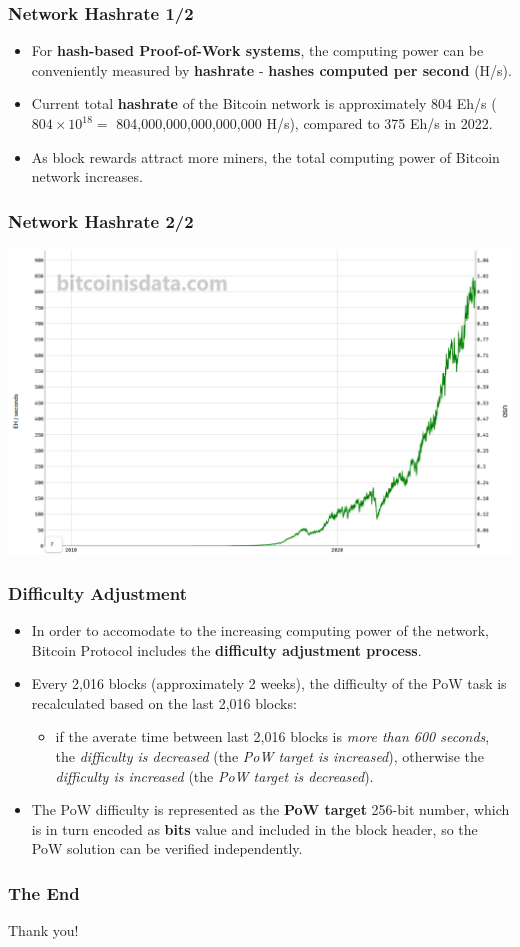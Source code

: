 \documentclass{beamer}
\begin{document}
\begin{frame}
  \frametitle{Network Hashrate 1/2}
  \begin{itemize}
  \item For \textbf{hash-based Proof-of-Work systems}, the computing power can
    be conveniently measured by \textbf{hashrate} - \textbf{hashes computed per
      second} (H/s).
  \item Current total \textbf{hashrate} of the Bitcoin network is approximately
    804 Eh/s ($804 \times 10^{18} = $ 804,000,000,000,000,000 H/s), compared to
    375 Eh/s in 2022.
  \item As block rewards attract more miners, the total computing power of
    Bitcoin network increases.
  \end{itemize}
\end{frame}

\begin{frame}
  \frametitle{Network Hashrate 2/2}
  \includegraphics[width=\textwidth]{hashrate}
\end{frame}

\begin{frame}
  \frametitle{Difficulty Adjustment}
  \begin{itemize}
  \item In order to accomodate to the increasing computing power of the network,
    Bitcoin Protocol includes the \textbf{difficulty adjustment process}.
  \item Every 2,016 blocks (approximately 2 weeks), the difficulty of the PoW
    task is recalculated based on the last 2,016 blocks:
    \begin{itemize}
    \item if the averate time between last 2,016 blocks is \textit{more than 600
        seconds}, the \textit{difficulty is decreased} (the \textit{PoW target
        is increased}), otherwise the \textit{difficulty is increased} (the
      \textit{PoW target is decreased}).
    \end{itemize}
  \item The PoW difficulty is represented as the \textbf{PoW target} 256-bit
    number, which is in turn encoded as \textbf{bits} value and included in the
    block header, so the PoW solution can be verified independently.
  \end{itemize}
\end{frame}

\begin{frame}
  \frametitle{The End}
  \begin{center}
    Thank you!
  \end{center}
\end{frame}
\end{document}
